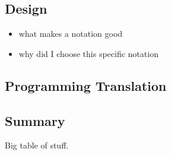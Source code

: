 \subsection{Design}

\begin{itemize}
	\item what makes a notation good
	\item why did I choose this specific notation
\end{itemize}

\subsection{Programming Translation}

\subsection{Summary}

Big table of stuff.
